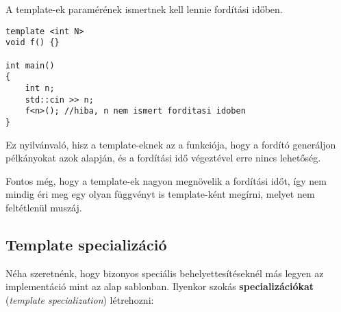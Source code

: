 \documentclass[a4paper,11.5pt,table]{article}
\begin{document}
	A template-ek paramérének ismertnek kell lennie fordítási időben.
	\begin{lstlisting}
template <int N>
void f() {}

int main()
{
	int n;
	std::cin >> n;
	f<n>(); //hiba, n nem ismert forditasi idoben
}
	\end{lstlisting}
	Ez nyilvánvaló, hisz a template-eknek az a funkciója, hogy a fordító generáljon pélkányokat azok alapján, és a fordítási idő végeztével erre nincs lehetőség.
	
	\medskip
	Fontos még, hogy a template-ek nagyon megnövelik a fordítási időt, így nem mindig éri meg egy olyan függvényt is template-ként megírni, melyet nem feltétlenül muszáj.
	\subsection{Template specializáció}
	Néha szeretnénk, hogy bizonyos speciális behelyettesítéseknél más legyen az implementáció mint az alap sablonban. Ilyenkor szokás \textbf{specializációkat} (\textit{template specialization}) létrehozni:
	
\end{document}
